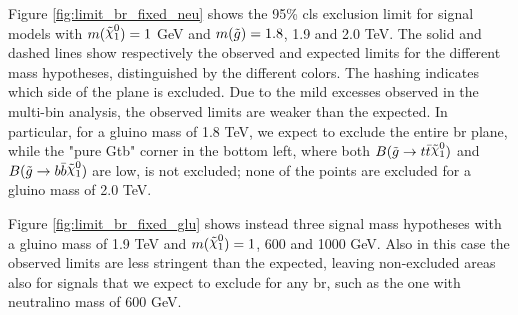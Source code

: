Figure \ref{fig:limit_br_fixed_neu} shows the 95\% \gls{cls} exclusion limit for signal models with $m(\ninoone) = 1$ GeV and 
$m(\tilde{g}) = 1.8$, 1.9 and 2.0 TeV. The solid and dashed lines show respectively the observed and expected limits for the different 
mass hypotheses, distinguished by the different colors. The hashing indicates which side of the plane is excluded. 
Due to the mild excesses observed in the multi-bin analysis, the observed limits are weaker than the expected. 
In particular, for a gluino mass of 1.8 TeV, we expect to exclude the entire \gls{br} plane, while the "pure Gtb" corner 
in the bottom left, where both $B(\gluino \to t \bar{t} \ninoone)$ and $B(\gluino \to b \bar{b} \ninoone)$ are low, 
is not excluded; none of the points are excluded for a gluino mass of 2.0 TeV. 

Figure \ref{fig:limit_br_fixed_glu} shows instead three signal mass hypotheses with a gluino mass of 1.9 TeV 
and $m(\ninoone) = 1$, 600 and 1000 GeV. Also in this case the observed limits are less stringent than the expected, leaving 
non-excluded areas also for signals that we expect to exclude for any \gls{br}, such as the one with neutralino mass of 600 GeV.



